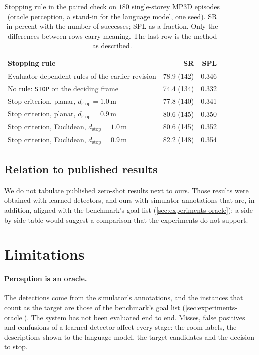 \documentclass[10pt]{article}
\newcommand{\code}[1]{\texttt{#1}}
\newcommand{\m}{\,\mathrm{m}}
\begin{document}
\begin{table}[t]
\centering
\caption{Stopping rule in the paired check on $180$ single-storey MP3D
episodes (oracle perception, a stand-in for the language model, one seed). SR
in percent with the number of successes; SPL as a fraction. Only the
differences between rows carry meaning. The last row is the method as
described.}
\label{tab:stop-check}
\small
\begin{tabular}{@{}lrr@{}}
\toprule
Stopping rule & SR & SPL \\
\midrule
Evaluator-dependent rules of the earlier revision    & 78.9 (142) & 0.346 \\
No rule: \code{STOP} on the deciding frame           & 74.4 (134) & 0.332 \\
Stop criterion, planar, $d_{\mathrm{stop}}=1.0\m$    & 77.8 (140) & 0.341 \\
Stop criterion, planar, $d_{\mathrm{stop}}=0.9\m$    & 80.6 (145) & 0.350 \\
Stop criterion, Euclidean, $d_{\mathrm{stop}}=1.0\m$ & 80.6 (145) & 0.352 \\
Stop criterion, Euclidean, $d_{\mathrm{stop}}=0.9\m$ & 82.2 (148) & 0.354 \\
\bottomrule
\end{tabular}
\end{table}

\subsection{Relation to published results}\label{sec:results-comparison}
We do not tabulate published zero-shot results next to ours. Those results
were obtained with learned detectors, and ours with simulator annotations that
are, in addition, aligned with the benchmark's goal list
(\cref{sec:experiments-oracle}); a side-by-side table would suggest a
comparison that the experiments do not support.

\section{Limitations}\label{sec:limitations}

\paragraph{Perception is an oracle.} The detections come from the simulator's
annotations, and the instances that count as the target are those of the
benchmark's goal list (\cref{sec:experiments-oracle}). The system has not been
evaluated end to end. Misses, false positives and confusions of a learned
detector affect every stage: the room labels, the descriptions shown to the
language model, the target candidates and the decision to stop.
\end{document}
